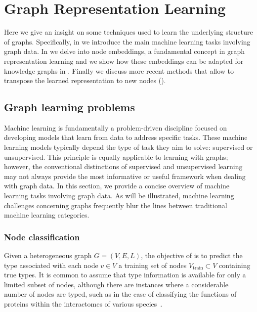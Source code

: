 \chapter{Graph Representation Learning}\label{grl}
Here we give an insight on some techniques used to learn the underlying structure of graphs. Specifically, in  we introduce the main machine learning tasks involving graph data. In  we delve into node embeddings, a fundamental concept in graph representation learning and we show how these embeddings can be adapted for knowledge graphs in . Finally we discuss more recent methods that allow to transpose the learned representation to new nodes ().

\section{Graph learning problems}\label{sec:graphLearningProblems}
Machine learning is fundamentally a problem-driven discipline focused on developing models that learn from data to address specific tasks. These machine learning models typically depend the type of task they aim to solve: supervised or unsupervised. This principle is equally applicable to learning with graphs; however, the conventional distinctions of supervised and unsupervised learning may not always provide the most informative or useful framework when dealing with graph data. In this section, we provide a concise overview of machine learning tasks involving graph data. As will be illustrated, machine learning challenges concerning graphs frequently blur the lines between traditional machine learning categories.

\subsection{Node classification}
Given a heterogeneous graph $ G = (V,E,L) $, the objective of  is to predict the type associated with each node $ v \in V $ a training set of nodes $ V_\text{train} \subset V $ containing true types. It is common to assume that type information is available for only a limited subset of nodes, although there are instances where a considerable number of nodes are typed, such as in the case of classifying the functions of proteins within the interactomes of various species~\cite{Hamilton2017inductiveRepresentationLearning}.

